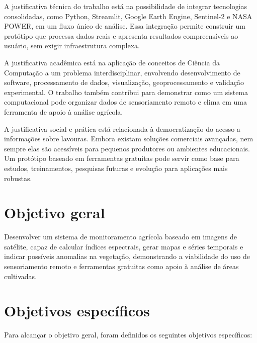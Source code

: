 A justificativa técnica do trabalho está na possibilidade de integrar tecnologias consolidadas, como Python, Streamlit, Google Earth Engine, Sentinel-2 e NASA POWER, em um fluxo único de análise. Essa integração permite construir um protótipo que processa dados reais e apresenta resultados compreensíveis ao usuário, sem exigir infraestrutura complexa.

A justificativa acadêmica está na aplicação de conceitos de Ciência da Computação a um problema interdisciplinar, envolvendo desenvolvimento de software, processamento de dados, visualização, geoprocessamento e validação experimental. O trabalho também contribui para demonstrar como um sistema computacional pode organizar dados de sensoriamento remoto e clima em uma ferramenta de apoio à análise agrícola.

A justificativa social e prática está relacionada à democratização do acesso a informações sobre lavouras. Embora existam soluções comerciais avançadas, nem sempre elas são acessíveis para pequenos produtores ou ambientes educacionais. Um protótipo baseado em ferramentas gratuitas pode servir como base para estudos, treinamentos, pesquisas futuras e evolução para aplicações mais robustas.

\section{Objetivo geral}\label{sec:obj_geral}

Desenvolver um sistema de monitoramento agrícola baseado em imagens de satélite, capaz de calcular índices espectrais, gerar mapas e séries temporais e indicar possíveis anomalias na vegetação, demonstrando a viabilidade do uso de sensoriamento remoto e ferramentas gratuitas como apoio à análise de áreas cultivadas.

\section{Objetivos específicos}\label{sec:obj_espec}

Para alcançar o objetivo geral, foram definidos os seguintes objetivos específicos:


